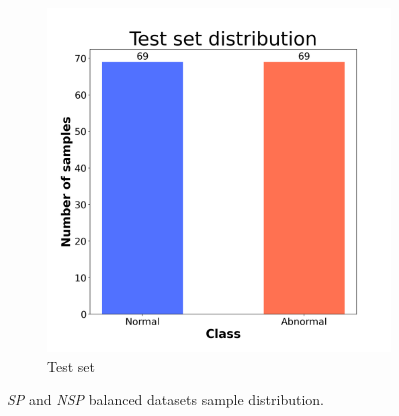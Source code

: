 \begin{figure}[H]
\begin{subfigure}[t]{0.45\textwidth}
    \includegraphics[width=1\textwidth]{images/exper1/SP/test_dist.png}
    \caption{Test set}
\end{subfigure}
    \caption{\textit{SP} and \textit{NSP} balanced datasets sample distribution.}
\end{figure}

